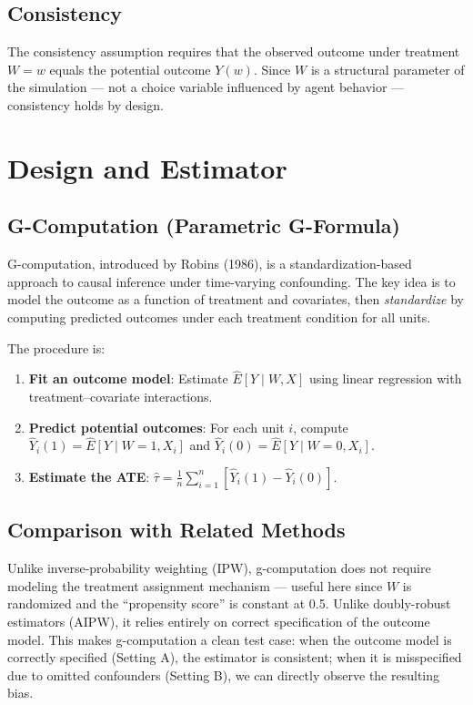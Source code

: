 \documentclass[
]{article}
\providecommand{\tightlist}{%
  \setlength{\itemsep}{0pt}\setlength{\parskip}{0pt}}
\begin{document}
\subsection{Consistency}\label{consistency}

The consistency assumption requires that the observed outcome under
treatment \(W = w\) equals the potential outcome \(Y(w)\). Since \(W\)
is a structural parameter of the simulation --- not a choice variable
influenced by agent behavior --- consistency holds by design.

\section{Design and Estimator}\label{design-and-estimator}

\subsection{G-Computation (Parametric
G-Formula)}\label{g-computation-parametric-g-formula}

G-computation, introduced by Robins (1986), is a standardization-based
approach to causal inference under time-varying confounding. The key
idea is to model the outcome as a function of treatment and covariates,
then \emph{standardize} by computing predicted outcomes under each
treatment condition for all units.

The procedure is:

\begin{enumerate}
\def\labelenumi{\arabic{enumi}.}
\tightlist
\item
  \textbf{Fit an outcome model}: Estimate \(\hat{E}[Y \mid W, X]\) using
  linear regression with treatment--covariate interactions.
\item
  \textbf{Predict potential outcomes}: For each unit \(i\), compute
  \(\hat{Y}_i(1) = \hat{E}[Y \mid W = 1, X_i]\) and
  \(\hat{Y}_i(0) = \hat{E}[Y \mid W = 0, X_i]\).
\item
  \textbf{Estimate the ATE}:
  \(\hat{\tau} = \frac{1}{n}\sum_{i=1}^{n}[\hat{Y}_i(1) - \hat{Y}_i(0)]\).
\end{enumerate}

\subsection{Comparison with Related
Methods}\label{comparison-with-related-methods}

Unlike inverse-probability weighting (IPW), g-computation does not
require modeling the treatment assignment mechanism --- useful here
since \(W\) is randomized and the ``propensity score'' is constant at
0.5. Unlike doubly-robust estimators (AIPW), it relies entirely on
correct specification of the outcome model. This makes g-computation a
clean test case: when the outcome model is correctly specified (Setting
A), the estimator is consistent; when it is misspecified due to omitted
confounders (Setting B), we can directly observe the resulting bias.
\end{document}
